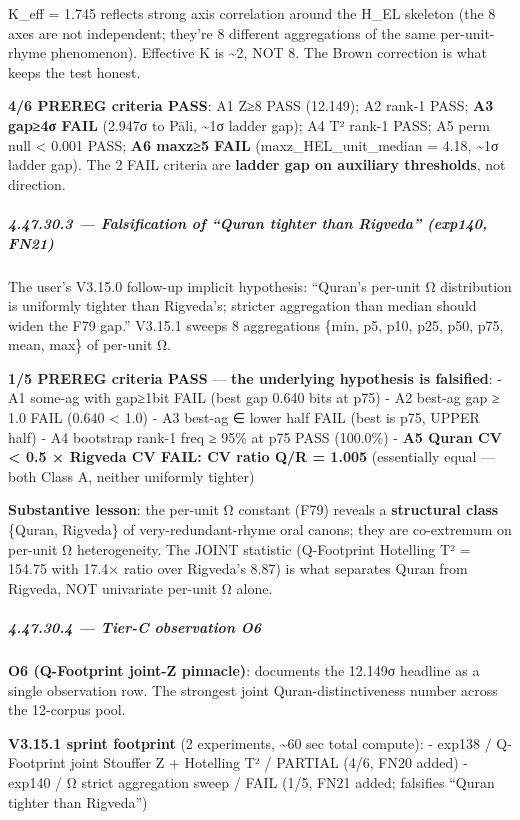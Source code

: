 \documentclass[
]{article}
\begin{document}
K\_eff = 1.745 reflects strong axis correlation around the H\_EL
skeleton (the 8 axes are not independent; they're 8 different
aggregations of the same per-unit-rhyme phenomenon). Effective K is
\textasciitilde2, NOT 8. The Brown correction is what keeps the test
honest.

\textbf{4/6 PREREG criteria PASS}: A1 Z≥8 PASS (12.149); A2 rank-1 PASS;
\textbf{A3 gap≥4σ FAIL} (2.947σ to Pāli, \textasciitilde1σ ladder gap);
A4 T² rank-1 PASS; A5 perm null \textless{} 0.001 PASS; \textbf{A6
max\textbar z\textbar≥5 FAIL} (max\textbar z\textbar\_HEL\_unit\_median
= 4.18, \textasciitilde1σ ladder gap). The 2 FAIL criteria are
\textbf{ladder gap on auxiliary thresholds}, not direction.

\subparagraph{4.47.30.3 --- Falsification of ``Quran tighter than
Rigveda'' (exp140,
FN21)}\label{falsification-of-quran-tighter-than-rigveda-exp140-fn21}

The user's V3.15.0 follow-up implicit hypothesis: ``Quran's per-unit Ω
distribution is uniformly tighter than Rigveda's; stricter aggregation
than median should widen the F79 gap.'' V3.15.1 sweeps 8 aggregations
\{min, p5, p10, p25, p50, p75, mean, max\} of per-unit Ω.

\textbf{1/5 PREREG criteria PASS} --- \textbf{the underlying hypothesis
is falsified}: - A1 some-ag with gap≥1bit FAIL (best gap 0.640 bits at
p75) - A2 best-ag gap ≥ 1.0 FAIL (0.640 \textless{} 1.0) - A3 best-ag ∈
lower half FAIL (best is p75, UPPER half) - A4 bootstrap rank-1 freq ≥
95\% at p75 PASS (100.0\%) - \textbf{A5 Quran CV \textless{} 0.5 ×
Rigveda CV FAIL: CV ratio Q/R = 1.005} (essentially equal --- both Class
A, neither uniformly tighter)

\textbf{Substantive lesson}: the per-unit Ω constant (F79) reveals a
\textbf{structural class} \{Quran, Rigveda\} of very-redundant-rhyme
oral canons; they are co-extremum on per-unit Ω heterogeneity. The JOINT
statistic (Q-Footprint Hotelling T² = 154.75 with 17.4× ratio over
Rigveda's 8.87) is what separates Quran from Rigveda, NOT univariate
per-unit Ω alone.

\subparagraph{4.47.30.4 --- Tier-C observation
O6}\label{tier-c-observation-o6}

\textbf{O6 (Q-Footprint joint-Z pinnacle)}: documents the 12.149σ
headline as a single observation row. The strongest joint
Quran-distinctiveness number across the 12-corpus pool.

\textbf{V3.15.1 sprint footprint} (2 experiments, \textasciitilde60 sec
total compute): - exp138 / Q-Footprint joint Stouffer Z + Hotelling T² /
PARTIAL (4/6, FN20 added) - exp140 / Ω strict aggregation sweep / FAIL
(1/5, FN21 added; falsifies ``Quran tighter than Rigveda'')
\end{document}
